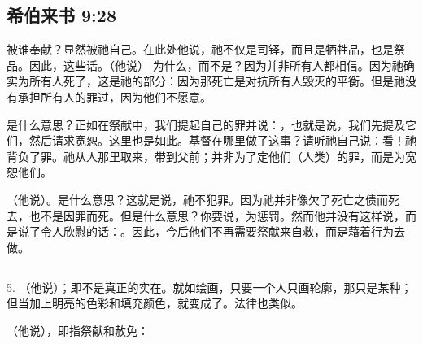 
\subsection{希伯来书 9:28}

 被谁奉献？显然被祂自己。在此处他说，祂不仅是司铎，而且是牺牲品，也是祭品。因此，这些话。（他说） 为什么，而不是？因为并非所有人都相信。因为祂确实为所有人死了，这是祂的部分：因为那死亡是对抗所有人毁灭的平衡。但是祂没有承担所有人的罪过，因为他们不愿意。\par

是什么意思？正如在祭献中，我们提起自己的罪并说：，也就是说，我们先提及它们，然后请求宽恕。这里也是如此。基督在哪里做了这事？请听祂自己说：看！祂背负了罪。祂从人那里取来，带到父前；并非为了定他们（人类）的罪，而是为宽恕他们。\par

（他说）。是什么意思？这就是说，祂不犯罪。因为祂并非像欠了死亡之债而死去，也不是因罪而死。但是什么意思？你要说，为惩罚。然而他并没有这样说，而是说了令人欣慰的话：。因此，今后他们不再需要祭献来自救，而是藉着行为去做。\par


\subsection{}

5. （他说）；即不是真正的实在。就如绘画，只要一个人只画轮廓，那只是某种；但当加上明亮的色彩和填充颜色，就变成了。法律也类似。\par

（他说），即指祭献和赦免：\par


